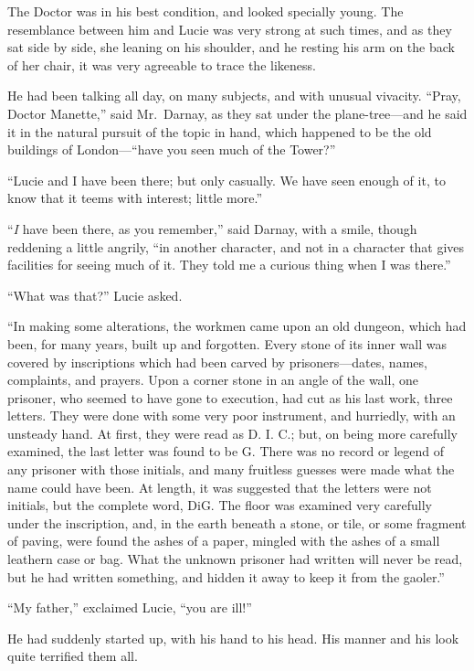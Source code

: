 The Doctor was in his best condition, and looked specially young.
The resemblance between him and Lucie was very strong at such times,
and as they sat side by side, she leaning on his shoulder, and he
resting his arm on the back of her chair, it was very agreeable to
trace the likeness.

He had been talking all day, on many subjects, and with unusual vivacity.
``Pray, Doctor Manette,'' said Mr.\ Darnay, as they sat under the
plane-tree---and he said it in the natural pursuit of the topic in
hand, which happened to be the old buildings of London---``have you
seen much of the Tower?''

``Lucie and I have been there; but only casually.  We have seen enough
of it, to know that it teems with interest; little more.''

``\emph{I} have been there, as you remember,'' said Darnay, with a smile,
though reddening a little angrily, ``in another character, and not in
a character that gives facilities for seeing much of it.  They told
me a curious thing when I was there.''

``What was that?'' Lucie asked.

``In making some alterations, the workmen came upon an old dungeon,
which had been, for many years, built up and forgotten.  Every stone
of its inner wall was covered by inscriptions which had been carved
by prisoners---dates, names, complaints, and prayers.  Upon a corner
stone in an angle of the wall, one prisoner, who seemed to have gone
to execution, had cut as his last work, three letters.  They were
done with some very poor instrument, and hurriedly, with an unsteady
hand.  At first, they were read as D. I. C.; but, on being more
carefully examined, the last letter was found to be G. There was no
record or legend of any prisoner with those initials, and many
fruitless guesses were made what the name could have been.
At length, it was suggested that the letters were not initials, but
the complete word, DiG.  The floor was examined very carefully under
the inscription, and, in the earth beneath a stone, or tile, or some
fragment of paving, were found the ashes of a paper, mingled with the
ashes of a small leathern case or bag.  What the unknown prisoner had
written will never be read, but he had written something, and hidden
it away to keep it from the gaoler.''

``My father,'' exclaimed Lucie, ``you are ill!''

He had suddenly started up, with his hand to his head.  His manner
and his look quite terrified them all.

